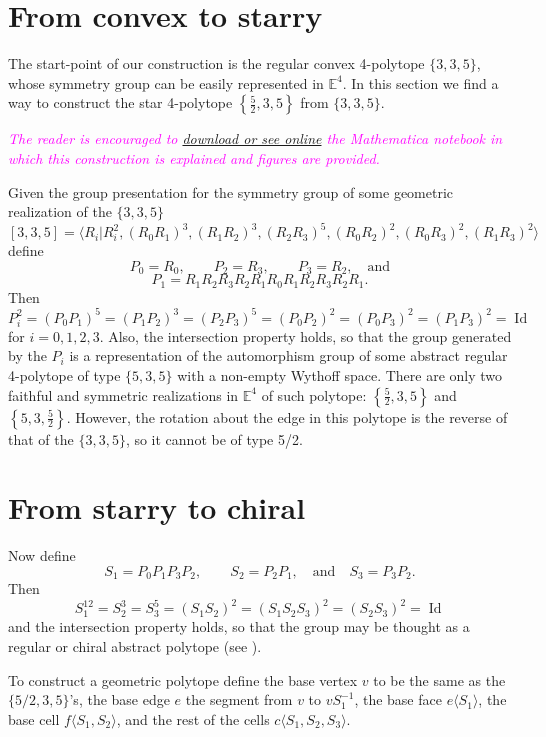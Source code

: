 \documentclass[spanish]{article}
\theoremstyle{definition}
\newcommand{\E}{\mathbb{E}}
\DeclareMathOperator{\Id}{Id}
\begin{document}
	\section{From convex to starry}
	The start-point of our construction is the regular convex 4-polytope $\{3,3,5\}$, whose symmetry group can be easily represented in $\E^4$.  In this section we find a way to construct the star 4-polytope $\left\{\frac{5}{2},3,5\right\}$ from $\{3,3,5\}$.
	
	\textcolor{magenta}{\textit{The reader is encouraged to \href{https://www.wolframcloud.com/obj/dangcasanova/Published/chiral-4polytope.nb}{download or see online} the Mathematica notebook in which this construction is explained and figures are provided.}}
	
	Given the group presentation for the symmetry group of some geometric realization of the $\{3,3,5\}$
		\[[3,3,5]=\langle R_i|R_i^2,(R_0R_1)^3,(R_1R_2)^3,(R_2R_3)^5,(R_0R_2)^2,(R_0R_3)^2,(R_1R_3)^2\rangle\]
	define
		\[P_0=R_0,\qquad P_2=R_3,\qquad P_3=R_2,\quad\text{and}\]
		\[P_1=R_1R_2R_3R_2R_1R_0R_1R_2R_3R_2R_1.\]
	Then
		\[ P_i^2=(P_0P_1)^5=(P_1P_2)^3=(P_2P_3)^5=(P_0P_2)^2=(P_0P_3)^2=(P_1P_3)^2=\Id\]
	for $i=0,1,2,3$.
	Also, the intersection property holds, so that the group generated by the $P_i$ is a representation of the automorphism group of some abstract regular 4-polytope of type $\{5,3,5\}$ with a non-empty Wythoff space. There are only two faithful and symmetric realizations in $\mathbb{E}^4$ of such polytope: $\left\{\frac{5}{2},3,5\right\}$ and $\left\{5,3,\frac{5}{2}\right\}$. However, the rotation about the edge in this polytope is the reverse of that of the $\{3,3,5\}$, so it cannot be of type 5/2.
	

	\section{From starry to chiral}
	Now define
		\[S_1=P_0P_1P_3P_2,\qquad S_2=P_2P_1,\quad\text{and}\quad S_3=P_3P_2.\]
	Then
		\[S_1^{12}=S_2^3=S_3^5=(S_1S_2)^2=(S_1S_2S_3)^2=(S_2S_3)^2=\Id\]
	and the intersection property holds, so that the group may be thought as a regular or chiral abstract polytope (see \cite{schulte-chiral}).
	
	To construct a geometric polytope define the base vertex $v$ to be the same as the $\{5/2,3,5\}$'s, the base edge $e$ the segment from $v$ to $vS_1^{-1}$, the base face $e\langle S_1\rangle$, the base cell $f\langle S_1,S_2\rangle$, and the rest of the cells $c\langle S_1,S_2,S_3\rangle$.
	
\end{document}
